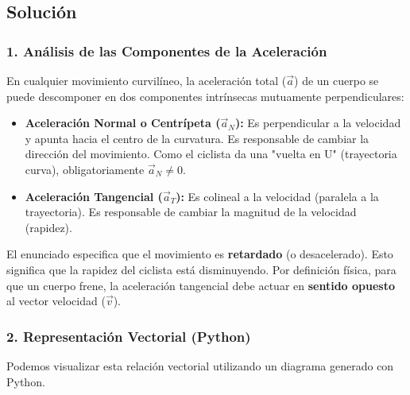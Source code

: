 \documentclass[12pt, a4paper]{article}
\begin{document}
\subsection*{Solución}

\subsubsection*{1. Análisis de las Componentes de la Aceleración}
En cualquier movimiento curvilíneo, la aceleración total ($\vec{a}$) de un cuerpo se puede descomponer en dos componentes intrínsecas mutuamente perpendiculares:
\begin{itemize}
    \item \textbf{Aceleración Normal o Centrípeta ($\vec{a}_N$):} Es perpendicular a la velocidad y apunta hacia el centro de la curvatura. Es responsable de cambiar la dirección del movimiento. Como el ciclista da una "vuelta en U" (trayectoria curva), obligatoriamente $\vec{a}_N \neq 0$.
    \item \textbf{Aceleración Tangencial ($\vec{a}_T$):} Es colineal a la velocidad (paralela a la trayectoria). Es responsable de cambiar la magnitud de la velocidad (rapidez).
\end{itemize}

El enunciado especifica que el movimiento es \textbf{retardado} (o desacelerado). Esto significa que la rapidez del ciclista está disminuyendo. Por definición física, para que un cuerpo frene, la aceleración tangencial debe actuar en \textbf{sentido opuesto} al vector velocidad ($\vec{v}$).

\subsubsection*{2. Representación Vectorial (Python)}
Podemos visualizar esta relación vectorial utilizando un diagrama generado con Python.
\end{document}
